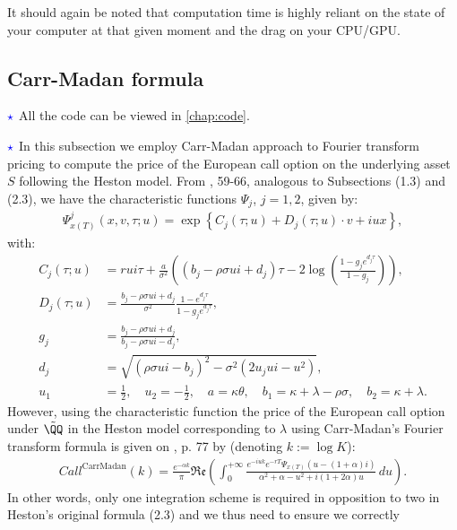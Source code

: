 \documentclass[11pt]{article}
\numberwithin{equation}{section}
\newcommand{\lc}{\left\{}
\newcommand{\rc}{\right\}}
\begin{document}
It should again be noted that computation time is highly
reliant on the state of your computer at that given moment and the drag on your CPU/GPU.
\newpage
\subsection{Carr-Madan formula}
$\textcolor{blue}{\star}$ All the code can be viewed in \autoref{chap:code}.

$\textcolor{blue}{\star}$ In this subsection we employ Carr-Madan approach to
Fourier transform pricing
to compute the price of the European call option on the underlying asset $S$
following the Heston model. From \cite{Havrylenko2024}, 59-66,
analogous to Subsections
(1.3) and (2.3), we have the characteristic functions $\Psi_j$, $j=1,2$, given by:
\begin{align*}
    \Psi_{x(T)}^j(x,v,\tau;u)=\exp \lc C_j (\tau; u) + D_j (\tau; u) \cdot v + i  u x \rc,
\end{align*}
with:
\begin{align*}
    C_j(\tau ; u) &= rui\tau + \frac{a}{\sigma^2}\left( (b_j - \rho\sigma ui + d_j) \tau - 2 \log \left( \frac{1 - g_j e^{d_j \tau}}{1 - g_j} \right) \right), \\
    D_j(\tau ; u) &= \frac{b_j - \rho \sigma ui + d_j}{\sigma^2} \frac{1 - e^{d_j \tau}}{1 - g_j e^{d_j \tau}}, \\
    g_j &= \frac{b_j - \rho\sigma ui + d_j}{b_j - \rho\sigma ui - d_j}, \\
    d_j &= \sqrt{(\rho\sigma ui - b_j)^2 - \sigma^2(2u_jui - u^2)},\\
    u_1 &= \frac{1}{2}, \quad u_2 = -\frac{1}{2}, \quad a = \kappa\theta, \quad b_1 = \kappa + \lambda - \rho\sigma, \quad b_2 = \kappa + \lambda.
\end{align*}
However, using the characteristic function the price of the European call option under
$\tilde{\QQ}$ in the Heston model corresponding to $\lambda$ using Carr-Madan's
Fourier transform formula is
given on \cite{Havrylenko2024}, p. 77 by (denoting $k:=\log K$):
\begin{align*}
    Call^{\text{CarrMadan}}(k) = \frac{e^{-\alpha k}}{\pi} \mathfrak{Re} \left( \int_{0}^{+\infty} \frac{e^{-iu k} e^{-rT} \Psi_{x(T)}\left(u - (1 + \alpha)i\right)}{\alpha^{2} + \alpha - u^{2} + i(1 + 2\alpha)u} \, du \right).
\end{align*}
In other words, only one integration scheme is required in opposition to two in
Heston's original formula (2.3) and we thus need to ensure we correctly
\end{document}
